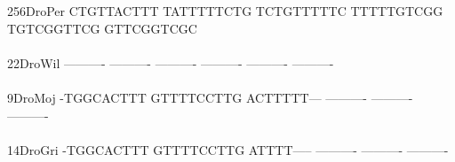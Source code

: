 \documentclass[11pt,twoside,reqno,a4paper]{article}
\begin{document}
{256\hspace*{2\charwidth}DroPer	CTGTTACTTT	TATTTTTCTG	TCTGTTTTTC	TTTTTGTCGG	TGTCGGTTCG	GTTCGGTCGC	\\
\hspace*{5\charwidth}\hspace*{7\charwidth}\hspace*{1\charwidth}\hspace*{1\charwidth}\hspace*{1\charwidth}\hspace*{1\charwidth}\hspace*{1\charwidth}\hspace*{1\charwidth}\\
22\hspace*{3\charwidth}DroWil	----------	----------	----------	----------	----------	----------	\\
\hspace*{5\charwidth}\hspace*{7\charwidth}\hspace*{1\charwidth}\hspace*{1\charwidth}\hspace*{1\charwidth}\hspace*{1\charwidth}\hspace*{1\charwidth}\hspace*{1\charwidth}\\
9\hspace*{4\charwidth}DroMoj	-TGGCACTTT	GTTTTCCTTG	ACTTTTT---	----------	----------	----------	\\
\hspace*{5\charwidth}\hspace*{7\charwidth}\hspace*{1\charwidth}\hspace*{1\charwidth}\hspace*{1\charwidth}\hspace*{1\charwidth}\hspace*{1\charwidth}\hspace*{1\charwidth}\\
14\hspace*{3\charwidth}DroGri	-TGGCACTTT	GTTTTCCTTG	ATTTT-----	----------	----------	----------	\\
\hspace*{5\charwidth}\hspace*{7\charwidth}\hspace*{1\charwidth}\hspace*{1\charwidth}\hspace*{1\charwidth}\hspace*{1\charwidth}\hspace*{1\charwidth}\hspace*{1\charwidth}\\
}
\end{document}

